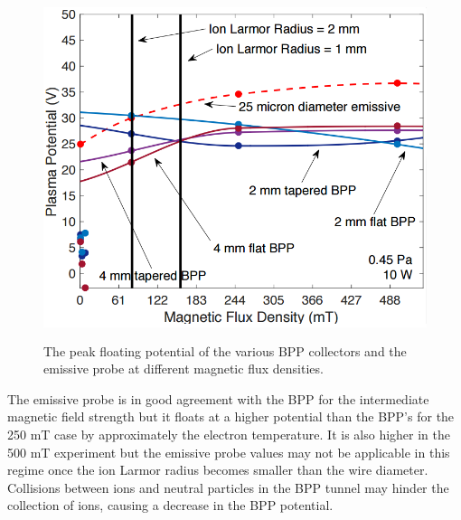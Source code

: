 \begin{figure}[H]
\centering
\includegraphics[width=1.0\textwidth, height = 10cm]{summary.png}
\caption{The peak floating potential of the various BPP collectors and the emissive probe at different magnetic flux densities. }
\label{fig:summary}
\end{figure}

The emissive probe is in good agreement with the BPP for the intermediate magnetic field strength but it floats at a higher potential than the BPP's for the 250 mT case by approximately the electron temperature. It is also higher in the 500 mT experiment but the emissive probe values may not be applicable in this regime once the ion Larmor radius becomes smaller than the wire diameter. Collisions between ions and neutral particles in the BPP tunnel may hinder the collection of ions, causing a decrease in the BPP potential. 

